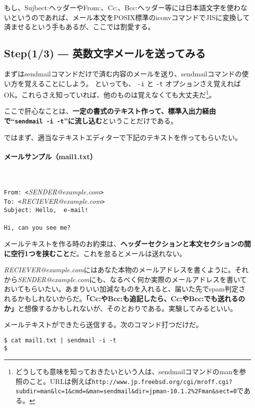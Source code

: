 もし、Sujbect:ヘッダーやFrom:、Cc:、Bcc:ヘッダー等には日本語文字を使わないというのであれば、メール本文をPOSIX標準のiconvコマンドでJISに変換して済ませるという手もあるが、ここでは割愛する。

\subsection*{Step(1/3) ― 英数文字メールを送ってみる}

まずはsendmailコマンドだけで済む内容のメールを送り、sendmailコマンドの使い方を覚えることにしよう。
といっても、 \verb|-i| と \verb|-t| オプションさえ覚えればOK。これらさえ知っていれば、他のものは覚えなくても大丈夫だ\footnote{どうしても意味を知っておきたいという人は、sendmailコマンドのmanを参照のこと。URLは例えば\verb|http://www.jp.freebsd.org/cgi/mroff.cgi?subdir=man&lc=1&cmd=&man=sendmail&dir=jpman-10.1.2%2Fman&sect=0|である。}。

ここで肝心なことは、\textbf{一定の書式のテキスト作って、標準入出力経由で``\verb|sendmail -i -t|''に流し込む}ということだけである。

ではまず、適当なテキストエディターで下記のテキストを作ってもらいたい。
\paragraph{メールサンプル（mail1.txt）}　\\
\begin{frameboxit}{160.0mm}
	\verb|From: <|\textit{SENDER@example.com}\verb|>| \\
	\verb|To: <|\textit{RECIEVER@example.com}\verb|>| \\
	\verb|Subject: Hello,  e-mail!| \\
	\verb|| \\
	\verb|Hi, can you see me?|
\end{frameboxit}

メールテキストを作る時のお約束は、\textbf{ヘッダーセクションと本文セクションの間に空行1つを挟むこと}だ。これを怠るとメールは送れない。

\textit{RECIEVER@example.com}にはあなた本物のメールアドレスを書くように。それから\textit{SENDER@example.com}にも、なるべく何か実際のメールアドレスを書いておいてもらいたい。あまりいい加減なものを入れると、届いた先でspam判定されるかもしれないからだ。\textbf{「Cc:やBcc:も追記したら、Cc:やBcc:でも送れるのか」}と想像するかもしれないが、そのとおりである。実験してみるといい。

メールテキストができたら送信する。次のコマンド打つだけだ。
\begin{screen}
	\verb!$ cat mail1.txt | sendmail -i -t! \return \\
	\verb!$ !
\end{screen}

